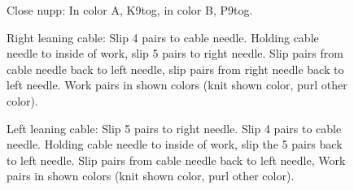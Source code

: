 \documentclass[11pt]{article}
\begin{document}
\begin{figure}
Close nupp: In color A, K9tog, in color B, P9tog. 

Right leaning cable: Slip 4 pairs to cable needle. Holding cable needle to inside of work, slip 5 pairs to right needle. Slip pairs from cable needle back to left needle, slip pairs from right needle back to left needle. Work pairs in shown colors (knit shown color, purl other color). 

Left leaning cable: Slip 5 pairs to right needle. Slip 4 pairs to cable needle. Holding cable needle to inside of work, slip the 5 pairs back to left needle. Slip pairs from cable needle back to left needle,  Work pairs in shown colors (knit shown color, purl other color). 
\end{figure}
\end{document}
